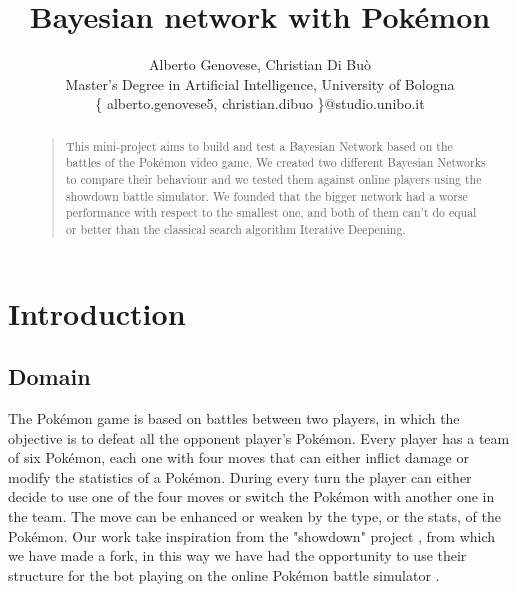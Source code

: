 \documentclass[letterpaper]{article}
\begin{document}
%
\title{Bayesian network with Pokémon}
\author{Alberto Genovese, Christian Di Buò\\
Master's Degree in Artificial Intelligence, University of Bologna\\
\{ alberto.genovese5, christian.dibuo \}@studio.unibo.it
}
\maketitle



\begin{abstract}
\begin{quote}
This mini-project aims to build and test a Bayesian Network based on the battles of the Pokémon video game. We created two different Bayesian Networks to compare their behaviour and we tested them against online players using the showdown battle simulator. We founded that the bigger network had a worse performance with respect to the smallest one, and both of them can't do equal or better than the classical search algorithm Iterative Deepening.



\end{quote}
\end{abstract}


\section{Introduction}
\subsection{Domain}
The Pokémon game is based on battles between two players, in which the objective is to defeat all the opponent player's Pokémon. Every player has a team of six Pokémon, each one with four moves that can either inflict damage or modify the statistics of a Pokémon. During every turn the player can either decide to use one of the four moves or switch the Pokémon with another one in the team. The move can be enhanced or weaken by the type, or the stats, of the Pokémon.
Our work take inspiration from the "showdown" project \cite{bot}, from which we have made a fork, in this way we have had the opportunity to use their structure for the bot playing on the online Pokémon battle simulator \cite{showdown}.
\end{document}
